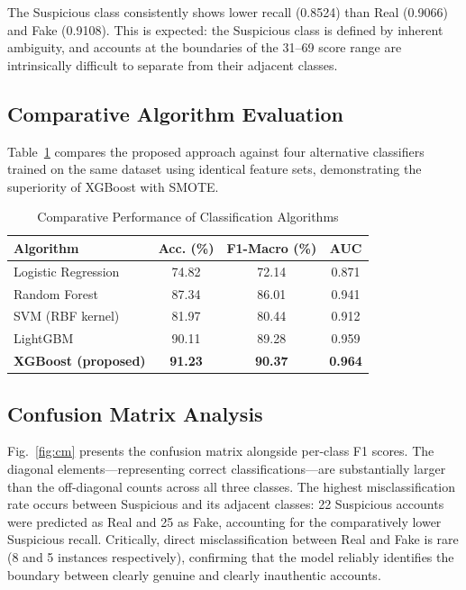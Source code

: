 \documentclass[conference]{IEEEtran}
\begin{document}
The Suspicious class consistently shows lower recall (0.8524) than Real
(0.9066) and Fake (0.9108). This is expected: the Suspicious class is
defined by inherent ambiguity, and accounts at the boundaries of the
31--69 score range are intrinsically difficult to separate from their
adjacent classes.

\subsection{Comparative Algorithm Evaluation}

Table~\ref{tab:compare} compares the proposed approach against four
alternative classifiers trained on the same dataset using identical
feature sets, demonstrating the superiority of XGBoost with SMOTE.

\begin{table}[htbp]
  \caption{Comparative Performance of Classification Algorithms}
  \label{tab:compare}
  \begin{center}
    \begin{tabular}{|l|c|c|c|}
      \hline
      \textbf{Algorithm} & \textbf{Acc. (\%)} & \textbf{F1-Macro (\%)} & \textbf{AUC} \\
      \hline
      Logistic Regression & 74.82 & 72.14 & 0.871 \\
      Random Forest       & 87.34 & 86.01 & 0.941 \\
      SVM (RBF kernel)    & 81.97 & 80.44 & 0.912 \\
      LightGBM            & 90.11 & 89.28 & 0.959 \\
      \textbf{XGBoost (proposed)} & \textbf{91.23} & \textbf{90.37} & \textbf{0.964} \\
      \hline
    \end{tabular}
  \end{center}
\end{table}

\subsection{Confusion Matrix Analysis}

Fig.~\ref{fig:cm} presents the confusion matrix alongside per-class
F1 scores. The diagonal elements---representing correct
classifications---are substantially larger than the off-diagonal counts
across all three classes. The highest misclassification rate occurs
between Suspicious and its adjacent classes: 22 Suspicious accounts were
predicted as Real and 25 as Fake, accounting for the comparatively lower
Suspicious recall. Critically, direct misclassification between Real and
Fake is rare (8 and 5 instances respectively), confirming that the model
reliably identifies the boundary between clearly genuine and clearly
inauthentic accounts.
\end{document}
